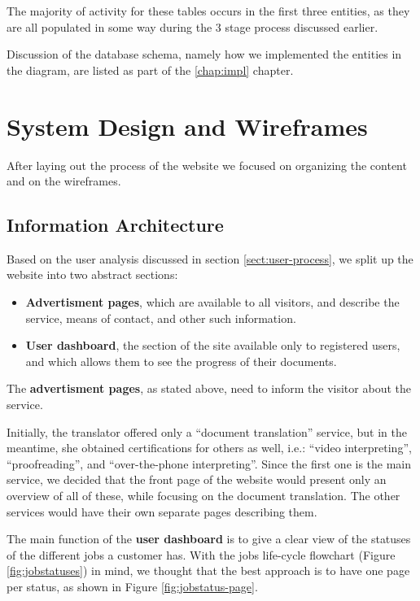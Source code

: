 \documentclass{l3proj}
\begin{document}
The majority of activity for these tables occurs in the first three entities, as
they are all populated 
in some way during the 3 stage process discussed earlier.

Discussion of the database schema, namely how we implemented the entities in the
diagram, are listed as part of the \ref{chap:impl} chapter.


\section{System Design and Wireframes}
\label{sect:system-design-and-wireframes}
After laying out the process of the website we focused on organizing the content
and on the wireframes.


\subsection{Information Architecture}
Based on the user analysis discussed in section \ref{sect:user-process}, we split
up the website into two abstract sections: 
\begin{itemize} 
	\item \textbf{Advertisment pages}, which are available to all visitors, and
	describe the service, means of contact, and other such information.
	\item \textbf{User dashboard}, the section of the site available only to
	registered users, and which allows them to see the progress of their 
	documents.
\end{itemize}

The \textbf{advertisment pages}, as stated above, need to inform the visitor
about the service. 

Initially, the translator offered only a ``document translation'' service, but
in the meantime, she obtained certifications for others as well, i.e.:
``video interpreting'', ``proofreading'', and ``over-the-phone interpreting''.
Since the first one is the main service, we decided that the front page of the
website would present only an overview of all of these, while focusing on the
document translation. The other services would have their own separate pages
describing them.

The main function of the \textbf{user dashboard} is to give a clear view of
the statuses of the different jobs a customer has. With the jobs life-cycle
flowchart (Figure \ref{fig:jobstatuses}) in mind, we thought that the best
approach is to have one page per status, as shown in Figure 
\ref{fig:jobstatus-page}.
\end{document}
